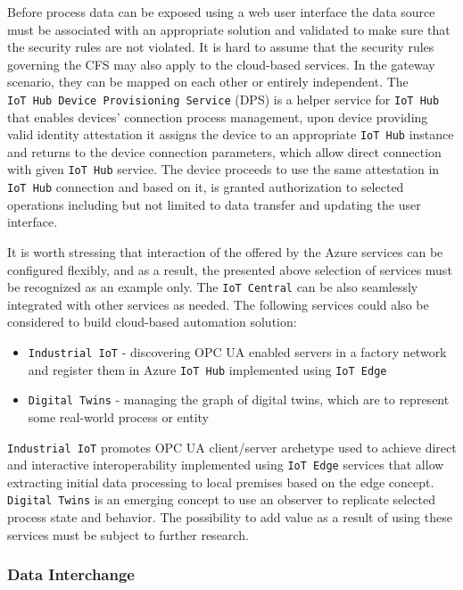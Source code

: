 \documentclass{jacsart}
\begin{document}
Before process data can be exposed using a web user interface the data source must be associated with an appropriate solution and validated to make sure that the security rules are not violated. It is hard to assume that the security rules governing the CFS may also apply to the cloud-based services. In the gateway scenario, they can be mapped on each other or entirely independent. The \texttt{IoT\ Hub\ Device\ Provisioning\ Service} (DPS) is a helper service for \texttt{IoT\ Hub} that enables devices' connection process management, upon device providing valid identity attestation it assigns the device to an appropriate \texttt{IoT\ Hub} instance and returns to the device connection parameters, which allow direct connection with given \texttt{IoT\ Hub} service. The device proceeds to use the same attestation in \texttt{IoT\ Hub} connection and based on it, is granted authorization to selected operations including but not limited to data transfer and updating the user interface.

It is worth stressing that interaction of the offered by the Azure
services can be configured flexibly, and as a result, the presented
above selection of services must be recognized as an example only. The
\texttt{IoT\ Central} can be also seamlessly integrated with other
services as needed. The following services could also be considered to
build cloud-based automation solution:

\begin{itemize}
      \item \texttt{Industrial\ IoT} - discovering OPC UA enabled servers in a factory network and register them in Azure \texttt{IoT\ Hub} implemented using \texttt{IoT\ Edge}
      \item \texttt{Digital\ Twins} - managing the graph of digital twins, which are to represent some real-world process or entity
\end{itemize}

\texttt{Industrial\ IoT} promotes OPC UA client/server archetype used to
achieve direct and interactive interoperability implemented using
\texttt{IoT\ Edge} services that allow extracting initial data
processing to local premises based on the edge concept.
\texttt{Digital\ Twins} is an emerging concept to use an observer to
replicate selected process state and behavior. The possibility to add
value as a result of using these services must be subject to further
research.

\hypertarget{data-interchange}{%
      \subsubsection{Data Interchange}\label{data-interchange}}
\end{document}
